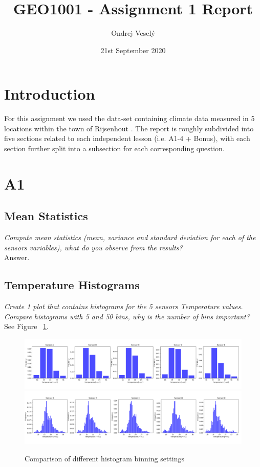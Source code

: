 \documentclass{article}
\title{GEO1001 - Assignment 1 Report}
\author{Ondrej Veselý}
\date{21st September 2020}
\begin{document}
\maketitle

\section*{Introduction}
For this assignment we used the data-set containing climate data measured in 5 locations within the town of Rijsenhout \citep{data}. The report is roughly subdivided into five sections related to each independent lesson (i.e. A1-4 + Bonus), with each section further split into a subsection for each corresponding question.

\newpage

\section{A1}

\subsection{Mean Statistics}
\textit{
Compute mean statistics (mean, variance and standard deviation for each of the sensors variables), what do you observe from the results?
}\\

Answer.

\subsection{Temperature Histograms}
\textit{
Create 1 plot that contains histograms for the 5 sensors Temperature values. Compare histograms with 5 and 50 bins, why is the number of bins important?
}\\

See Figure ~\ref{fig:1-2}.

\begin{figure}[!htb]
\centering
\includegraphics[width=\textwidth]{1-2-5_bins.png}
\includegraphics[width=\textwidth]{1-2-50_bins.png}
\caption{Comparison of different histogram binning settings}
\label{fig:1-2}
\end{figure}
\end{document}
